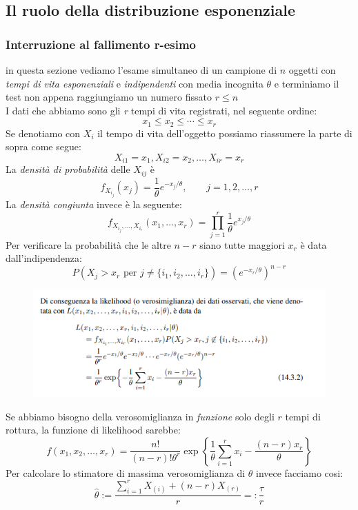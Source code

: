 \documentclass[]{article}
\begin{document}
    \subsection{Il ruolo della distribuzione esponenziale}
    \subsubsection{Interruzione al fallimento r-esimo}
    in questa sezione vediamo l'esame simultaneo di un campione di $n$ oggetti con \textit{tempi di vita esponenziali} e \textit{indipendenti} con media incognita $\theta$ e terminiamo il test non appena raggiungiamo un numero fissato $r \leq n$ \\
    I dati che abbiamo sono gli \textit{r} tempi di vita registrati, nel seguente ordine:
    \[ x_1 \leq x_2 \leq \cdots \leq x_r \]
    Se denotiamo con $X_i$ il tempo di vita dell'oggetto possiamo riassumere la parte di sopra come segue:
    \[ X_{i1} = x_1, X_{i2} = x_2, \ldots, X_{ir} = x_r \]
    La \textit{densità di probabilità} delle $X_{ij}$ è
    \[ f_{X_{i_j}} (x_j) = \frac{1}{\theta} e^{-x_j / \theta}, \qquad j = 1,2,\ldots, r \]
    La \textit{densità congiunta} invece è la seguente:
    \[ f_{X_{i_j}, \ldots, X_{i_r}} (x_1, \ldots, x_r) = \prod_{j=1}^{r} \frac{1}{\theta} e^{x_j / \theta} \]
    Per verificare la probabilità che le altre $n-r$ siano tutte maggiori $x_r$ è data dall'indipendenza:
    \[ P(X_j > x_r \text{ per } j \not = \{ i_1, i_2, \ldots, i_r \}) = (e^{-x_r / \theta})^{n-r} \]
    \begin{figure}[H]
        \includegraphics[width=\textwidth]{images/boh_12.png}
    \end{figure}
    Se abbiamo bisogno della verosomiglianza in \textit{funzione} solo degli $r$ tempi di rottura, la funzione di likelihood sarebbe:
    \[ f(x_1, x_2, \ldots, x_r) = \frac{n!}{(n-r)! \theta^r} \exp \left\{ \frac{1}{\theta} \sum_{i=1}^{r} x_i - \frac{(n-r) x_r}{\theta} \right\} \]
    Per calcolare lo stimatore di massima verosomiglianza di $\theta$ invece facciamo cosi:
    \[ \hat{\theta} := \frac{\sum_{i=1}^{r} X_{(i)} + (n-r) X_{(r)}}{r} =: \frac{\tau}{r} \]
\end{document}
